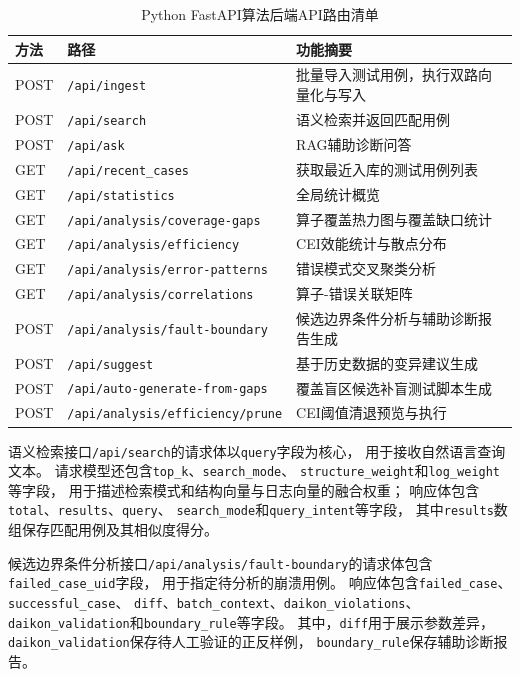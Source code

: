 \begin{table}[htbp]
\centering
\setlength{\tabcolsep}{6pt}
\renewcommand{\arraystretch}{1.4}
\caption{Python FastAPI算法后端API路由清单}
\label{tab:api_routes}
\begin{tabular}{llp{7.1cm}}
\toprule
方法 & 路径 & 功能摘要 \\
\midrule
POST & \texttt{/api/ingest} & 批量导入测试用例，执行双路向量化与写入 \\
POST & \texttt{/api/search} & 语义检索并返回匹配用例 \\
POST & \texttt{/api/ask} & RAG辅助诊断问答 \\
GET & \texttt{/api/recent\_cases} & 获取最近入库的测试用例列表 \\
GET & \texttt{/api/statistics} & 全局统计概览 \\
GET & \texttt{/api/analysis/}\allowbreak\texttt{coverage-gaps} & 算子覆盖热力图与覆盖缺口统计 \\
GET & \texttt{/api/analysis/}\allowbreak\texttt{efficiency} & CEI效能统计与散点分布 \\
GET & \texttt{/api/analysis/}\allowbreak\texttt{error-patterns} & 错误模式交叉聚类分析 \\
GET & \texttt{/api/analysis/}\allowbreak\texttt{correlations} & 算子-错误关联矩阵 \\
POST & \texttt{/api/analysis/}\allowbreak\texttt{fault-boundary} & 候选边界条件分析与辅助诊断报告生成 \\
POST & \texttt{/api/suggest} & 基于历史数据的变异建议生成 \\
POST & \texttt{/api/auto-generate}\allowbreak\texttt{-from-gaps} & 覆盖盲区候选补盲测试脚本生成 \\
POST & \texttt{/api/analysis/}\allowbreak\texttt{efficiency/prune} & CEI阈值清退预览与执行 \\
\bottomrule
\end{tabular}
\end{table}

语义检索接口\texttt{/api/search}的请求体以\texttt{query}字段为核心，
用于接收自然语言查询文本。
请求模型还包含\texttt{top\_k}、\texttt{search\_mode}、
\texttt{structure\_weight}和\texttt{log\_weight}等字段，
用于描述检索模式和结构向量与日志向量的融合权重；
响应体包含\texttt{total}、\texttt{results}、\texttt{query}、
\texttt{search\_mode}和\texttt{query\_intent}等字段，
其中\texttt{results}数组保存匹配用例及其相似度得分。

候选边界条件分析接口\texttt{/api/analysis/fault-boundary}的请求体包含
\texttt{failed\_case\_uid}字段，
用于指定待分析的崩溃用例。
响应体包含\texttt{failed\_case}、\texttt{successful\_case}、
\texttt{diff}、\texttt{batch\_context}、\texttt{daikon\_violations}、
\texttt{daikon\_validation}和\texttt{boundary\_rule}等字段。
其中，\texttt{diff}用于展示参数差异，
\texttt{daikon\_validation}保存待人工验证的正反样例，
\texttt{boundary\_rule}保存辅助诊断报告。

